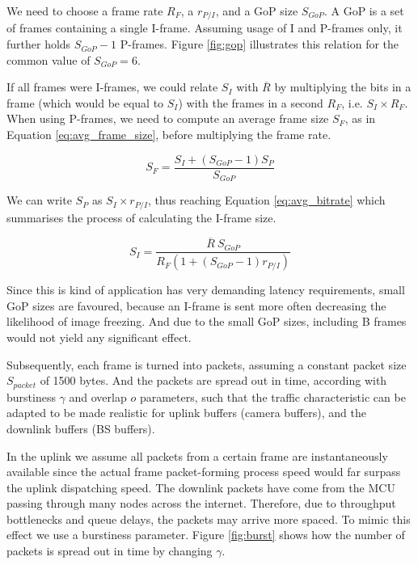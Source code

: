 We need to choose a frame rate $R_F$, a $r_{P/I}$, and a \ac{GoP} size $S_{GoP}$. A \ac{GoP} is a set of frames containing a single I-frame. Assuming usage of I and P-frames only, it further holds $S_{GoP} - 1$ P-frames. Figure \ref{fig:gop} illustrates this relation for the common value of $S_{GoP} = 6$.





If all frames were I-frames, we could relate $S_I$ with $\overline{R}$ by multiplying the bits in a frame (which would be equal to $S_I$) with the frames in a second $R_F$, i.e. $S_I \times R_F$. When using P-frames, we need to compute an average frame size $S_F$, as in Equation \eqref{eq:avg_frame_size}, before multiplying the frame rate.


\begin{equation} \label{eq:avg_frame_size}
    S_F = \frac{S_I + (S_{GoP} - 1) S_P}{S_{GoP}}
\end{equation}

\vspace{1.3cm}

We can write $S_P$ as $ S_I \times r_{P/I}$, thus reaching Equation \eqref{eq:avg_bitrate} which summarises the process of calculating the I-frame size.

\begin{equation} \label{eq:avg_bitrate} 
    S_I = \frac{\overline{R} \ S_{GoP}}{R_F \left( 1 + (S_{GoP} - 1) r_{P/I}\right)}
\end{equation}

Since this is kind of application has very demanding latency requirements, small GoP sizes are favoured, because an I-frame is sent more often decreasing the likelihood of image freezing. And due to the small GoP sizes, including B frames would not yield any significant effect.

Subsequently, each frame is turned into packets, assuming a constant packet size $S_{packet}$ of 1500 bytes. And the packets are spread out in time, according with burstiness $\gamma$ and overlap $o$ parameters, such that the traffic characteristic can be adapted to be made realistic for uplink buffers (camera buffers), and the downlink buffers (\ac{BS} buffers). 

In the uplink we assume all packets from a certain frame are instantaneously available since the actual frame packet-forming process speed would far surpass the uplink dispatching speed. The downlink packets have come from the \acs{MCU} passing through many nodes across the internet. Therefore, due to throughput bottlenecks and queue delays, the packets may arrive more spaced. To mimic this effect we use a burstiness parameter. Figure \ref{fig:burst} shows how the number of packets is spread out in time by changing $\gamma$.

